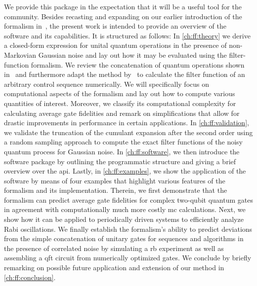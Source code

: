 We provide this package in the expectation that it will be a useful tool for the community.
Besides recasting and expanding on our earlier introduction of the formalism in~, the present work is intended to provide an overview of the software and its capabilities.
It is structured as follows: In \cref{ch:ff:theory} we derive a closed-form expression for unital quantum operations in the presence of non-Markovian Gaussian noise and lay out how it may be evaluated using the filter-function formalism.
We review the concatenation of quantum operations shown in~ and furthermore adapt the method by~\textcite{Green2013} to calculate the filter function of an arbitrary control sequence numerically.
We will specifically focus on computational aspects of the formalism and lay out how to compute various quantities of interest.
Moreover, we classify its computational complexity for calculating average gate fidelities and remark on simplifications that allow for drastic improvements in performance in certain applications.
In \cref{ch:ff:validation}, we validate the truncation of the cumulant expansion after the second order using a random sampling approach to compute the exact filter functions of the noisy quantum process for Gaussian noise.
In \cref{ch:ff:software}, we then introduce the \filterfunctions software package by outlining the programmatic structure and giving a brief overview over the \gls{api}.
Lastly, in \cref{ch:ff:examples}, we show the application of the software by means of four examples that highlight various features of the formalism and its implementation.
Therein, we first demonstrate that the formalism can predict average gate fidelities for complex two-qubit quantum gates in agreement with computationally much more costly \gls{mc} calculations.
Next, we show how it can be applied to periodically driven systems to efficiently analyze Rabi oscillations.
We finally establish the formalism's ability to predict deviations from the simple concatenation of unitary gates for sequences and algorithms in the presence of correlated noise by simulating a \gls{rb} experiment as well as assembling a \gls{qft} circuit from numerically optimized gates.
We conclude by briefly remarking on possible future application and extension of our method in \cref{ch:ff:conclusion}.

